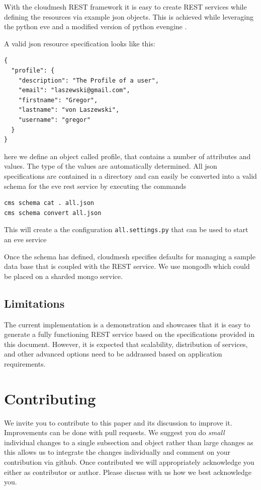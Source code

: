 \documentclass[10pt]{article}
\begin{document}
With the cloudmesh REST framework it is easy to create REST services
while defining the resources via example json objects. This is achieved
while leveraging the python eve \cite{www-eve} and a modified version of python
evengine \cite{www-cloudmesh-eveengine}. 

A valid json resource specification looks like this:

\begin{verbatim}
{
  "profile": {
    "description": "The Profile of a user",
    "email": "laszewski@gmail.com",
    "firstname": "Gregor",
    "lastname": "von Laszewski",
    "username": "gregor"
  }
}
\end{verbatim}

here we define an object called profile, that contains a number of
attributes and values. The type of the values are automatically
determined. All json specifications are contained in a directory and
can easily be converted into a valid schema for the eve rest service
by executing the commands

\begin{verbatim}
cms schema cat . all.json
cms schema convert all.json
\end{verbatim}

This will create a the configuration \verb|all.settings.py| that can
be used to start an eve service

Once the schema has defined, cloudmesh specifies defaults for managing
a sample data base that is coupled with the REST service. We use
mongodb which could be placed on a sharded mongo service. 

\subsection{Limitations}

The current implementation is a demonstration and showcases that it is
easy to generate a fully functioning REST service based on the
specifications provided in this document. However, it is expected that
scalability, distribution of services, and other advanced options
need to be addrassed based on application requirements.



\section{Contributing}

We invite you to contribute to this paper and its discussion to
improve it. Improvements can be done with pull requests. We suggest
you do {\em small} individual changes to a single subsection and
object rather than large changes as this allows us to integrate the
changes individually and comment on your contribution via github. Once
contributed we will appropriately acknowledge you either as
contributor or author. Please discuss with us how we best acknowledge
you.
\end{document}
